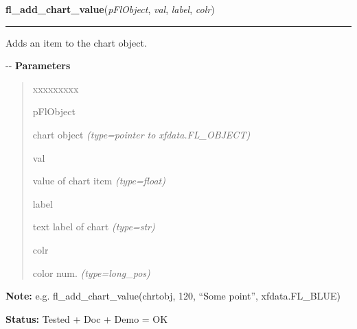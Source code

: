 \hspace{.8\funcindent}\begin{boxedminipage}{\funcwidth}

    \raggedright \textbf{fl\_add\_chart\_value}(\textit{pFlObject}, \textit{val}, \textit{label}, \textit{colr})

    \vspace{-1.5ex}

    \rule{\textwidth}{0.5\fboxrule}
\setlength{\parskip}{2ex}

Adds an item to the chart object.

-{}-
\setlength{\parskip}{1ex}
      \textbf{Parameters}
      \vspace{-1ex}

      \begin{quote}
        \begin{Ventry}{xxxxxxxxx}

          \item[pFlObject]


chart object
            {\it (type=pointer to xfdata.FL\_OBJECT)}

          \item[val]


value of chart item
            {\it (type=float)}

          \item[label]


text label of chart
            {\it (type=str)}

          \item[colr]


color num.
            {\it (type=long\_pos)}

        \end{Ventry}

      \end{quote}

\textbf{Note:} 
e.g. fl\_add\_chart\_value(chrtobj, 120, ``Some point'', xfdata.FL\_BLUE)


\textbf{Status:} 
Tested + Doc + Demo = OK


    \end{boxedminipage}

    \label{xformslib:flchart:fl_insert_chart_value}

    \vspace{0.5ex}

